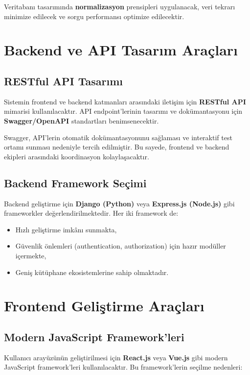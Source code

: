 \documentclass[a4paper,12pt]{report}
\begin{document}
Veritabanı tasarımında \textbf{normalizasyon} prensipleri uygulanacak, veri tekrarı minimize edilecek ve sorgu performansı optimize edilecektir.

\section{Backend ve API Tasarım Araçları}

\subsection{RESTful API Tasarımı}

Sistemin frontend ve backend katmanları arasındaki iletişim için \textbf{RESTful API} mimarisi kullanılacaktır. API endpoint'lerinin tasarımı ve dokümantasyonu için \textbf{Swagger/OpenAPI} standartları benimsenecektir.

Swagger, API'lerin otomatik dokümantasyonunu sağlaması ve interaktif test ortamı sunması nedeniyle tercih edilmiştir. Bu sayede, frontend ve backend ekipleri arasındaki koordinasyon kolaylaşacaktır.

\subsection{Backend Framework Seçimi}

Backend geliştirme için \textbf{Django (Python)} veya \textbf{Express.js (Node.js)} gibi frameworkler değerlendirilmektedir. Her iki framework de:

\begin{itemize}
    \item Hızlı geliştirme imkânı sunmakta,
    \item Güvenlik önlemleri (authentication, authorization) için hazır modüller içermekte,
    \item Geniş kütüphane ekosistemlerine sahip olmaktadır.
\end{itemize}

\section{Frontend Geliştirme Araçları}

\subsection{Modern JavaScript Framework'leri}

Kullanıcı arayüzünün geliştirilmesi için \textbf{React.js} veya \textbf{Vue.js} gibi modern JavaScript framework'leri kullanılacaktır. Bu framework'lerin seçilme nedenleri:
\end{document}

